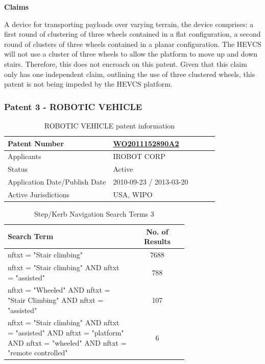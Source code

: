 \documentclass [12pt]{article}
\begin{document}
\textbf{Claims}

A device for transporting payloads over varying terrain, the device comprises: a first round of clustering of three wheels contained in a flat configuration, a second round of clusters of three wheels contained in a planar configuration.
The HEVCS will not use a cluster of three wheels to allow the platform to move up and down stairs. Therefore, this does not encroach on this patent.
Given that this claim only has one independent claim, outlining the use of three clustered wheels, this patent is not being impeded by the HEVCS platform.

\subsubsection{Patent 3 - ROBOTIC VEHICLE}

\begin{table}[H]
    \centering
    \setlength{\arrayrulewidth}{1.5pt}
    \begin{tabular}{|p{0.5\linewidth}|p{0.5\linewidth}|}
    \hline
    Patent Number & \href{https://worldwide.espacenet.com/patent/search/family/044675803/publication/WO2011152890A2?q=WO2011152890A2}{WO2011152890A2}\\
    \hline
    Applicants & IROBOT CORP\\
    \hline
    Status & Active\\
    \hline
    Application Date/Publish Date & 2010-09-23 / 2013-03-20\\
    \hline
    Active Jurisdictions & USA, WIPO\\
    \hline
    \end{tabular}
    \caption{ROBOTIC VEHICLE patent information}
    \label{table:robotic_vehicle_patent_information}
\end{table}

\begin{table}[H]
    \centering
    \setlength{\arrayrulewidth}{1.5pt}
    \begin{tabular}{|p{0.7\linewidth}|c|}
    \hline
    \cellcolor{gray!40}Search Term & \cellcolor{gray!40}No. of Results \\
    \hline
    nftxt = "Stair climbing" & 7688 \\
    \hline
    nftxt = "Stair climbing" AND nftxt = "assisted" & 788 \\
    \hline
    nftxt = "Wheeled" AND nftxt = "Stair Climbing" AND nftxt = "assisted" & 107 \\
    \hline
    nftxt = "Stair climbing" AND nftxt = "assisted" AND nftxt = "platform" AND nftxt = "wheeled" AND nftxt = "remote controlled"& 6 \\
    \hline
    \end{tabular}
    \caption{Step/Kerb Navigation Search Terms 3}
    \label{table:step_Kerb_nav_st_3}
\end{table}
\end{document}
